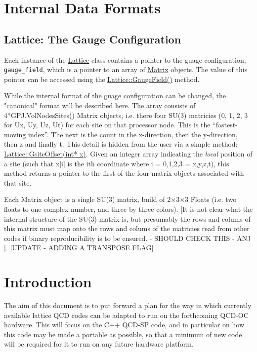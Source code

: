 \documentclass[12pt]{article}
\newcommand{\cde}[1]{{\tt #1}}            %
\begin{document}
\section{Internal Data Formats}

\subsection{Lattice: The Gauge Configuration}
Each instance of the \href{../doxygen/html/class_Lattice.html}{Lattice} 
class contains a pointer to the guage
configuration, \cde{gauge\_field}, which is a pointer to an array of
\href{../doxygen/html/class_Matrix.html}{Matrix} objects.  
The value of this pointer can be accessed using the
\href{../doxygen/html/class_Lattice.html#a11}{Lattice::GaugeField()} method.

While the internal format of the guage configuration can be changed, the
"canonical" format will be described here.  The array consists of
4*GPJ.VolNodesSites() Matrix objects, i.e. there four SU(3) matricies
(0, 1, 2, 3 for Ux, Uy, Uz, Ut) for each site on that processor node.
This is the ``fastest-moving index''.  The next is the count in the
x-direction, then the y-direction, then z and finally t.  This detail is
hidden from the user via a simple method: 
\href{../doxygen/html/class_Lattice.html#a13}{Lattice::GsiteOffset(int* x)}.
Given an integer array indicating the \emph{local} position of a site (such
that x[i] is the ith coordinate where i = {0,1,2,3} = {x,y,z,t}), this method
returns a pointer to the first of the four matrix objects associated with that
site.

Each Matrix object is a single SU(3) matrix, build of 2$\times$3$\times$3 Floats 
(i.e. two floats to one complex number, and three by three colors).  [It is
not clear what the internal structure of the SU(3) matrix is, but presumably
the rows and colums of this matrix must map onto the rows and colums of the
matricies read from other codes if binary reproducibility is to be ensured.  -
SHOULD CHECK THIS - ANJ ]. [UPDATE - ADDING A TRANSPOSE FLAG]

\section{Introduction}
The aim of this document is to put forward a plan for the way in which
currently available lattice QCD codes can be adapted to run on the
forthcoming QCD-OC hardware.  This will focus on the C++ QCD-SP code,
and in particular on how this code may be made a portable as possible,
so that a minimum of new code will be required for it to run on
any future hardware platform.
\end{document}
